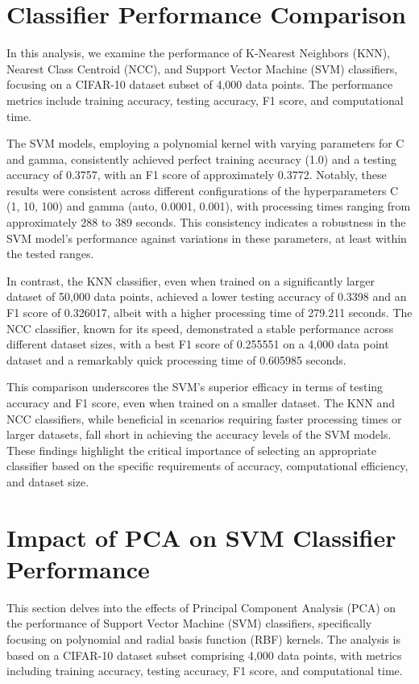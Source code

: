 \documentclass[conference]{IEEEtran}
\begin{document}
\section{Classifier Performance Comparison}

In this analysis, we examine the performance of K-Nearest Neighbors (KNN), Nearest Class Centroid (NCC), and Support Vector Machine (SVM) classifiers, focusing on a CIFAR-10 dataset subset of 4,000 data points. The performance metrics include training accuracy, testing accuracy, F1 score, and computational time.

The SVM models, employing a polynomial kernel with varying parameters for C and gamma, consistently achieved perfect training accuracy (1.0) and a testing accuracy of 0.3757, with an F1 score of approximately 0.3772. Notably, these results were consistent across different configurations of the hyperparameters C (1, 10, 100) and gamma (auto, 0.0001, 0.001), with processing times ranging from approximately 288 to 389 seconds. This consistency indicates a robustness in the SVM model's performance against variations in these parameters, at least within the tested ranges.

In contrast, the KNN classifier, even when trained on a significantly larger dataset of 50,000 data points, achieved a lower testing accuracy of 0.3398 and an F1 score of 0.326017, albeit with a higher processing time of 279.211 seconds. The NCC classifier, known for its speed, demonstrated a stable performance across different dataset sizes, with a best F1 score of 0.255551 on a 4,000 data point dataset and a remarkably quick processing time of 0.605985 seconds.

This comparison underscores the SVM's superior efficacy in terms of testing accuracy and F1 score, even when trained on a smaller dataset. The KNN and NCC classifiers, while beneficial in scenarios requiring faster processing times or larger datasets, fall short in achieving the accuracy levels of the SVM models. These findings highlight the critical importance of selecting an appropriate classifier based on the specific requirements of accuracy, computational efficiency, and dataset size.

\section{Impact of PCA on SVM Classifier Performance}

This section delves into the effects of Principal Component Analysis (PCA) on the performance of Support Vector Machine (SVM) classifiers, specifically focusing on polynomial and radial basis function (RBF) kernels. The analysis is based on a CIFAR-10 dataset subset comprising 4,000 data points, with metrics including training accuracy, testing accuracy, F1 score, and computational time.
\end{document}
